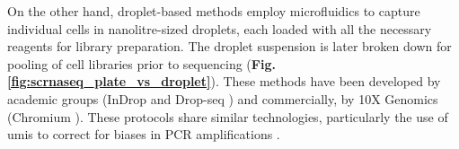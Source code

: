On the other hand, droplet-based methods employ microfluidics to capture individual cells in nanolitre-sized droplets, each loaded with all the necessary reagents for library preparation.
The droplet suspension is later broken down for pooling of cell libraries prior to sequencing (\textbf{Fig. \ref{fig:scrnaseq_plate_vs_droplet}}). 
These methods have been developed by academic groups (InDrop \cite{klein2015droplet} and Drop-seq \cite{macosko2015highly}) and commercially, by 10X Genomics (Chromium \cite{zheng2017massively}). 
These protocols share similar technologies, particularly the use of \glspl{umi} to correct for biases in PCR amplifications \cite{kivioja2012counting}. 
\\

